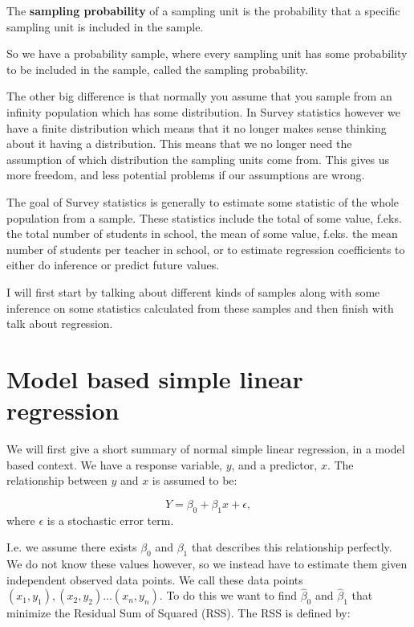 \documentclass{article}
\begin{document}
\begin{definition} \label{def:sampProb}
The \textbf{sampling probability} of a sampling unit is the probability that a specific sampling unit is included in the sample.
\end{definition}

So we have a probability sample, where every sampling unit has some probability to be included in the sample, called the sampling probability.


The other big difference is that normally you assume that you sample from an
infinity population which has some distribution. In Survey statistics however we
have a finite distribution which means that it no longer makes sense thinking
about it having a distribution. This means that we no longer need the assumption
of which distribution the sampling units come from. This gives us more freedom,
and less potential problems if our assumptions are wrong.


The goal of Survey statistics is generally to estimate some statistic of the whole
population from a sample. These statistics include the total of some value,
f.eks. the total number of students in school, the mean of some value, f.eks.
the mean number of students per teacher in school, or to estimate regression
coefficients to either do inference or predict future values.

I will first start by talking about different kinds of samples along with some
inference on some statistics calculated from these samples and then finish with
talk about regression.

\section{Model based simple linear regression} \label{sec:modLinReg}

We will first give a short summary of normal simple linear regression, in a
model based context. We have a response variable, \(y\), and a predictor, \(x\). The
relationship between \(y\) and \(x\) is assumed to be:

\begin{equation*}
Y = \beta_0 + \beta_1 x + \epsilon,
\end{equation*}
where \(\epsilon\) is a stochastic error term.

I.e. we assume there exists \(\beta_0\) and \(\beta_1\) that describes this
relationship perfectly.
We do not know these values however, so we instead have to estimate them given
independent observed data points. We call these data points \((x_1, y_1), (x_2, y_2)
... (x_n, y_n)\). To do
this we want to find \(\hat{\beta}_0\) and \(\hat{\beta}_1\) that minimize the
Residual Sum of Squared (RSS). The RSS is defined by:
\end{document}
